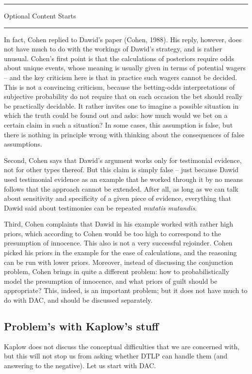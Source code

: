 \documentclass[10pt,dvipsnames,enabledeprecatedfontcommands]{scrartcl}
\newcommand{\intermezzoa}{
	\begin{minipage}[c]{13cm}
	\begin{center}\rule{10cm}{0.4pt}



	\tiny{\sc Optional Content Starts}
	
	\vspace{-1mm}
	
	\rule{10cm}{0.4pt}\end{center}
	\end{minipage}\nopagebreak 
	}
\begin{document}
\intermezzoa

In fact, Cohen replied to Dawid's paper (Cohen, 1988). His reply,
however, does not have much to do with the workings of Dawid's strategy,
and is rather unusual. Cohen's first point is that the calculations of
posteriors require odds about unique events, whose meaning is usually
given in terms of potential wagers -- and the key criticism here is that
in practice such wagers cannot be decided. This is not a convincing
criticism, because the betting-odds interpretations of subjective
probability do not require that on each occasion the bet should really
be practically decidable. It rather invites one to imagine a possible
situation in which the truth could be found out and asks: how much would
we bet on a certain claim in such a situation? In some cases, this
assumption is false, but there is nothing in principle wrong with
thinking about the consequences of false assumptions.

Second, Cohen says that Dawid's argument works only for testimonial
evidence, not for other types thereof. But this claim is simply false --
just because Dawid used testimonial evidence as an example that he
worked through it by no means follows that the approach cannot be
extended. After all, as long as we can talk about sensitivity and
specificity of a given piece of evidence, everything that Dawid said
about testimonies can be repeated \emph{mutatis mutandis}.

Third, Cohen complaints that Dawid in his example worked with rather
high priors, which according to Cohen would be too high to correspond to
the presumption of innocence. This also is not a very successful
rejoinder. Cohen picked his priors in the example for the ease of
calculations, and the reasoning can be run with lower priors. Moreover,
instead of discussing the conjunction problem, Cohen brings in quite a
different problem: how to probabilistically model the presumption of
innocence, and what priors of guilt should be appropriate? This, indeed,
is an important problem; but it does not have much to do with DAC, and
should be discussed separately.

\subsection{Problem's with Kaplow's
stuff}\label{problems-with-kaplows-stuff}

Kaplow does not discuss the conceptual difficulties that we are
concerned with, but this will not stop us from asking whether DTLP can
handle them (and answering to the negative). Let us start with DAC.
\end{document}
